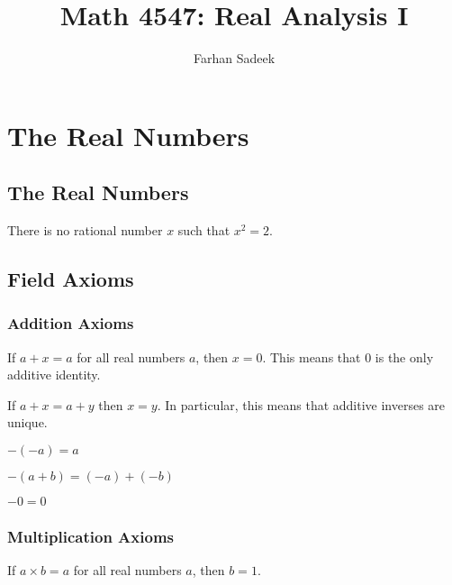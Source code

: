 \documentclass[11pt]{article}
\title{Math 4547: Real Analysis I}
\author{Farhan Sadeek}
\begin{document}
\maketitle
\section{The Real Numbers}
\subsection{The Real Numbers}

\begin{theorem}\label{1.1.1}
    There is no rational number \( x \) such that \( x^2 = 2 \).
\end{theorem}
\subsection{Field Axioms}
\subsubsection{Addition Axioms}
\begin{proposition}\label{1.2.1}
    If \( a + x = a \) for all real numbers \( a \), then \( x = 0 \). This means that \( 0 \)
    is the only additive identity.
\end{proposition}

\begin{proposition}\label{1.2.2}
    If \( a + x = a + y \) then \( x = y \). In particular, this means that additive
    inverses are unique.
\end{proposition}
\begin{proposition}\label{1.2.3}
    \( -( -a ) = a \)
\end{proposition}

\begin{proposition}\label{1.2.4}
    \( -( a + b ) = ( -a ) + ( -b ) \)
\end{proposition}

\begin{proposition}\label{1.2.5}
    \( -0 = 0 \)
\end{proposition}
\subsubsection{Multiplication Axioms}
\begin{proposition}\label{1.2.6}
    If \( a \times b = a \) for all real numbers \( a \), then \( b = 1 \).
\end{proposition}
\end{document}
